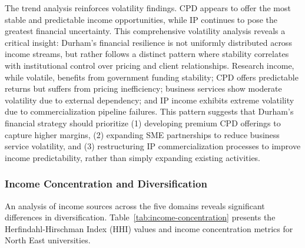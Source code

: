 \documentclass[journal,onecolumn, 10pt,draftclsnofoot]{IEEEtran}
\begin{document}
The trend analysis reinforces volatility findings. CPD appears to offer the most stable and predictable income opportunities, while IP continues to pose the greatest financial uncertainty. This comprehensive volatility analysis reveals a critical insight: Durham's financial resilience is not uniformly distributed across income streams, but rather follows a distinct pattern where stability correlates with institutional control over pricing and client relationships. Research income, while volatile, benefits from government funding stability; CPD offers predictable returns but suffers from pricing inefficiency; business services show moderate volatility due to external dependency; and IP income exhibits extreme volatility due to commercialization pipeline failures. This pattern suggests that Durham's financial strategy should prioritize (1) developing premium CPD offerings to capture higher margins, (2) expanding SME partnerships to reduce business service volatility, and (3) restructuring IP commercialization processes to improve income predictability, rather than simply expanding existing activities.

\subsubsection{Income Concentration and Diversification}

An analysis of income sources across the five domains reveals significant differences in diversification. Table~\ref{tab:income-concentration} presents the Herfindahl-Hirschman Index (HHI) values and income concentration metrics for North East universities.
\vspace{0.3cm}
\begin{table}[h]
\centering
\caption{Income Concentration Analysis - North East Universities}
\vspace{0.1cm}
\label{tab:income-concentration}
\end{table}
\end{document}
